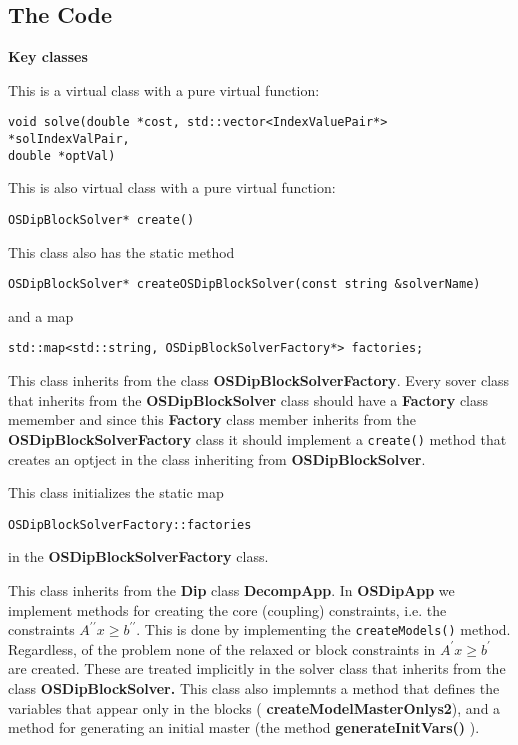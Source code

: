\documentclass[11pt]{article}
\begin{document}
\subsection{The Code}





{\bf Key classes}


\vskip 8pt
  This is a virtual class with a pure virtual
function: 

\begin{verbatim}
void solve(double *cost, std::vector<IndexValuePair*> *solIndexValPair,
double *optVal)
\end{verbatim}



\vskip 8pt
  This is also virtual class with a pure
virtual function: 

\begin{verbatim}
OSDipBlockSolver* create()
\end{verbatim}

This class also has the static method

\begin{verbatim}
OSDipBlockSolver* createOSDipBlockSolver(const string &solverName)
\end{verbatim}

and a map

\begin{verbatim}
std::map<std::string, OSDipBlockSolverFactory*> factories;
\end{verbatim}


\vskip 8pt
  This class inherits from the class {\bf
OSDipBlockSolverFactory}. Every sover class that inherits from the  {\bf
OSDipBlockSolver} class should have a {\bf Factory} class memember and since
this {\bf Factory} class member inherits from the {\bf
OSDipBlockSolverFactory} class it should implement a {\tt create()} method that
creates an optject in the class inheriting from {\bf
OSDipBlockSolver}.

\vskip 8pt
  This class initializes the static map

\begin{verbatim}
OSDipBlockSolverFactory::factories
\end{verbatim}
in the {\bf OSDipBlockSolverFactory} class. 

\vskip 8pt
  This class inherits from the {\bf Dip} class {\bf
DecompApp}. In {\bf OSDipApp} we implement methods for creating the core
(coupling) constraints, i.e. the constraints $A^{\prime \prime} x \ge
b^{\prime \prime}$.  This is done by implementing the  {\tt createModels()}
method. Regardless, of the problem none of the relaxed or block constraints in $A^{\prime } x \ge
b^{\prime}$ are created. These are treated implicitly in the solver class that
inherits from the class {\bf OSDipBlockSolver.}  This class also implemnts a
method that defines the variables that appear only in the blocks ({\bf
createModelMasterOnlys2}), and a method for generating an initial master (the
method {\bf generateInitVars()  }). 
\end{document}
